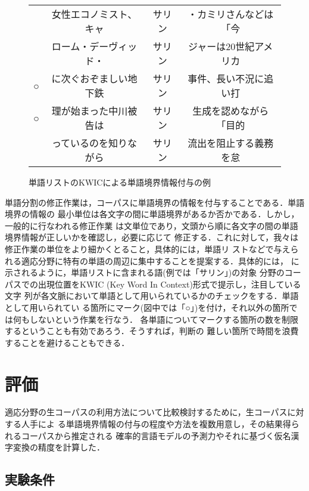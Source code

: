 \begin{figure}[t]
  \begin{center}
    \begin{tabular}{cccc}
      \hline
         & 女性エコノミスト、キャ & サリン & ・カミリさんなどは「今 \\
         & ローム・デーヴィッド・ & サリン & ジャーは20世紀アメリカ \\
      ○ & に次ぐおぞましい地下鉄 & サリン & 事件、長い不況に追い打 \\
      ○ & 理が始まった中川被告は & サリン & 生成を認めながら「目的 \\
         & っているのを知りながら & サリン & 流出を阻止する義務を怠 \\
      \hline
    \end{tabular}
  \end{center}
  \caption{単語リストのKWICによる単語境界情報付与の例}
  \label{figure:KWIC}
\end{figure}

単語分割の修正作業は，コーパスに単語境界の情報を付与することである．単語境界の情報の
最小単位は各文字の間に単語境界があるか否かである．しかし，一般的に行なわれる修正作業
は文単位であり，文頭から順に各文字の間の単語境界情報が正しいかを確認し，必要に応じて
修正する．これに対して，我々は修正作業の単位をより細かくとること，具体的には，単語リ
ストなどで与えられる適応分野に特有の単語の周辺に集中することを提案する．具体的には，
に示されるように，単語リストに含まれる語(例では「サリン」)の対象
分野のコーパスでの出現位置をKWIC (Key Word In Context)形式で提示し，注目している文字
列が各文脈において単語として用いられているかのチェックをする．単語として用いられてい
る箇所にマーク(図中では「○」)を付け，それ以外の箇所では何もしないという作業を行なう．
各単語についてマークする箇所の数を制限するということも有効であろう．そうすれば，判断の
難しい箇所で時間を浪費することを避けることもできる．

\section{評価}
\label{section:evaluation}

適応分野の生コーパスの利用方法について比較検討するために，生コーパスに対する人手によ
る単語境界情報の付与の程度や方法を複数用意し，その結果得られるコーパスから推定される
確率的言語モデルの予測力やそれに基づく仮名漢字変換の精度を計算した．



\subsection{実験条件}

